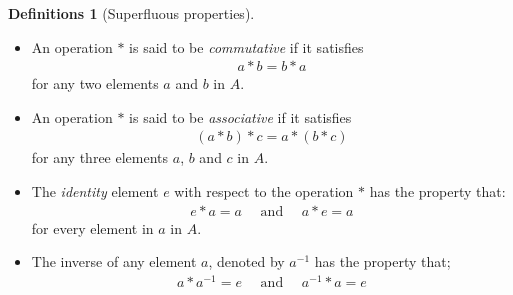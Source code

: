 \documentclass[nohyper,nobib]{tufte-handout}
\theoremstyle{definition}
\newtheorem{defns}[thm]{Definitions}
\theoremstyle{remark}
\begin{document}
\begin{defns}[Superfluous properties]
    \begin{itemize}
        \item An operation $*$ is said to be \emph{commutative} if it satisfies
            \begin{align}
                a * b  = b * a
            \end{align}
            for any two elements $a$ and $b$ in $A$.
        \item An operation $*$ is said to be \emph{associative} if it satisfies 
            \begin{align}
                (a * b) * c = a * (b * c)
            \end{align}
            for any three elements $a$, $b$ and $c$ in $A$.
        \item The \emph{identity} element $e$ with respect to the operation $*$ has the property that:
            \begin{align}
                e * a  = a \quad\text{ and }\quad a * e = a
            \end{align}
            for every element in $a$ in $A$.
        \item The inverse of any element $a$, denoted by $a^{-1}$ has the property that;
            \begin{align}
                a * a^{-1} = e  \quad\text{ and }\quad a^{-1} * a = e
            \end{align}
    \end{itemize}
\end{defns}
\end{document}

